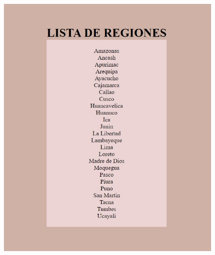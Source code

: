 \documentclass{article}
\begin{document}
\begin{itemize}
\begin{figure}[H]
			\includegraphics[width=1.0\textwidth,keepaspectratio]{img/Ejer1T2result.jpg}
		\end{figure}
	\end{itemize}
\end{document}
